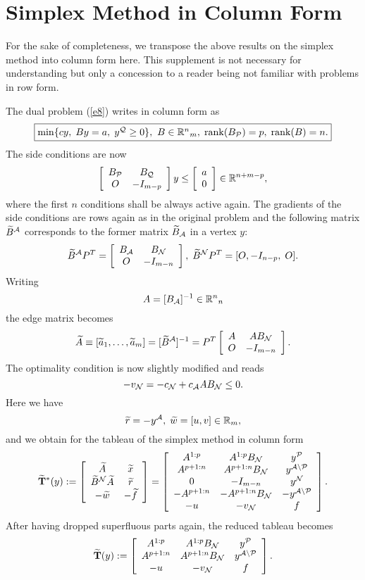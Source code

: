 \section{Simplex Method in Column Form}
For the sake of completeness, we transpose the above results on the simplex
method into column form here.  This supplement is not necessary for
understanding but only a concession to a reader being not familiar with
problems in row form.
\par
The dual problem (\ref{e8}) writes in column form as
\[
\fbox{$
\min \{cy, \; By = a, \; y^{\Q} \geq 0\},\
B \in \Bbb{R}^n{}_m, \;
\rank (B_{\P}) = p, \; \rank (B) = n.
$}
\]
The side conditions are now
\[
\ba{[}{cc} B_{\P} & B_{\Q}\\ O & -I_{m-p}\ea{]}
y \leq \ba{[}{c}a \\ 0 \ea{]} \in \Bbb{R}^{n+m-p},
\]
where the first $n$ conditions shall be always active again.  The gradients of
the side conditions are rows again as in the original problem and the
following matrix $\wi{B}^{\A}$ corresponds to the former matrix
$\wi{B}_{\A}$ in a vertex $y$:
\[
\wi{B}^{\A}P^T = \ba{[}{ccc} B_{\A} & B_{\N}\\
                             O      & -I_{m-n}\ea{]},
\; \wi{B}^{\N}P^T = [O, -I_{n-p}, \; O].
\]
Writing
\[
A = [B_{\A}]^{-1} \in \Bbb{R}^n{}_n
\]
the edge matrix becomes
\[
\wi{A} \equiv [\wi{a}_1, \ldots, \wi{a}_m]
= [\wi{B}^{\A}]^{-1} = P^T\ba{[}{cc} A & AB_{\N}\\
                                     O & -I_{m-n} \ea{]}.
\]
The optimality condition is now slightly modified and reads
%
\[
- v_{\N} = - c_{\N} + c_{\A}AB_{\N} \leq 0.
\]
Here we have
\[
\wi{r} = - y^{\A}, \; \wi{w} = [u, v] \in  \Bbb{R}_m,
\]
and we obtain for the tableau of the simplex method in column form
%
\[
\wi{{\bf T}}^*(y) :=
\ba{[}{cc} \wi{A} & \wi{x}\\  \wi{B}^{\N}\wi{A} & \wi{r}\\- \wi{w} &
- \wi{f} \ea{]} =
\ba{[}{ccc}
A^{1:p}     & A^{1:p}B_{\N}    & y^{\P} \\
A^{p+1:n}   & A^{p+1:n}B_{\N}  & y^{\A \backslash \P}\\
    0       &- I_{m-n}         & y^{\N}\\
- A^{p+1:n} & - A^{p+1:n}B_{\N}& - y^{\A \backslash \P}\\
- u     & - v_{\N}     &  f
\ea{]}.
\]
After having dropped superfluous parts again, the reduced tableau becomes
\[
\wi{{\bf T}}(y) :=
\ba{[}{ccc}
A^{1:p}   & A^{1:p}B_{\N}     & y^{\P} \\
A^{p+1:n} & A^{p+1:n}B_{\N}  & y^{\A \backslash \P}\\
- u       & - v_{\N}          & f
\ea{]}.
\]
